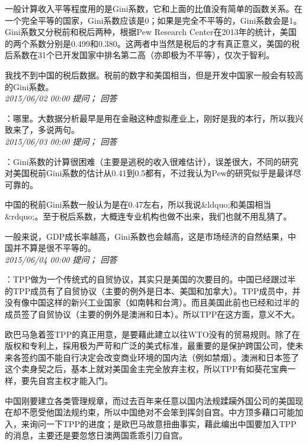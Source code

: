 \documentclass[twocolumn]{ctexart}
\begin{document}
一般计算收入平等程度用的是Gini系数，它和上面的比值没有简单的函数关系。在一个完全平等的国家，Gini系数应该是0；如果是完全不平等的，Gini系数会是1。Gini系数又分税前和税后两种，根据Pew Research Center在2013年的统计，美国的两个系数分别是0.499和0.380。这两者中当然是税后的才有真正意义，美国的税后系数在31个已开发国家中排名第二高（亦即极为不平等），仅次于智利。

我找不到中国的税后数据。税前的数字和美国相当，但是开发中国家一般会有较高的Gini系数。\\

\textit{\hfill\noindent\small 2015/06/02 00:00 提问； 回答}

：哪里。大数据分析最早是用在金融这种虚拟產业上，刚好是我的本行，所以我兴致来了，多说两句。\\

\textit{\hfill\noindent\small 2015/06/03 00:00 提问； 回答}

：Gini系数的计算很困难（主要是逃税的收入很难估计），误差很大，不同的研究对美国税前Gini系数的估计从0.41到0.5都有，不过我认为Pew的研究似乎是最详尽可靠的。

中国的税前Gini系数一般认为是在0.47左右，所以我说\&ldquo;和美国相当\&rdquo;。至于税后系数，大概连专业机构也做不出来，我们也就不用乱猜了。

一般来说，GDP成长率越高，Gini系数也会越高，这是市场经济的自然结果，中国并不算是很不平等的。\\

\textit{\hfill\noindent\small 2015/06/04 00:00 提问； 回答}

：TPP做为一个传统式的自贸协议，其实只是美国的次要目的。中国已经跟过半的TPP成员有了自贸协议（主要的例外是日本、美国和加拿大）。TPP成员中，并没有像中国这样的新兴工业国家（如南韩和台湾）。而且美国此前也已经和过半的成员签了自贸协议（主要的例外是澳洲和日本）。所以TPP在这方面，意义不大。

欧巴马急着签TPP的真正用意，是要藉此建立以往WTO没有的贸易规则。除了在版权和专利上，採用极为严苛和广泛的美式标准，最重要的是保护跨国公司，使未来各签约国不能自行决定会改变商业环境的国内法（例如禁烟）。澳洲和日本签了这个卖身契之后，基本上就对美国金主完全放弃主权，所以TPP有如葵花宝典一样，要先自宫主权才能入门。

中国刚要建立各类管理规章，而过去百年来任意以国内法规蹂躏外国公司的美国现在却不愿受他国法规约束，所以中国绝对不会笨到挥剑自宫。中方顶多藉口可能加入，来询问一下TPP的进度；是欧巴马故意扭曲事实，藉此编出中国要加入TPP的消息，主要还是要忽悠日澳两国乖乖引刀自宫。\\
\end{document}
